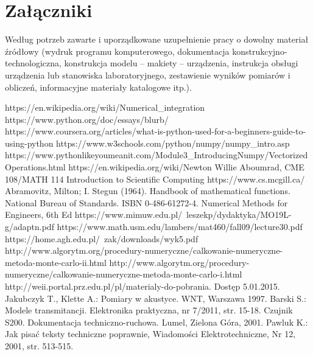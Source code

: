 \documentclass[12pt,twoside]{article}
\begin{document}
\clearpage

\section*{Załączniki}

Według potrzeb zawarte i uporządkowane uzupełnienie pracy o dowolny materiał źródłowy (wydruk programu komputerowego, dokumentacja kons\-truk\-cyj\-no-\-tech\-no\-lo\-gicz\-na, konstrukcja modelu -- makiety -- urządzenia, instrukcja obsługi urządzenia lub stanowiska laboratoryjnego, zestawienie wyników pomiarów i obliczeń, informacyjne materiały katalogowe itp.).


\clearpage


\begin{thebibliography}{4}
 https://en.wikipedia.org/wiki/Numerical\_integration
 https://www.python.org/doc/essays/blurb/
 https://www.coursera.org/articles/what-is-python-used-for-a-beginners-guide-to-using-python
 https://www.w3schools.com/python/numpy/numpy\_intro.asp
 https://www.pythonlikeyoumeanit.com/Module3\_IntroducingNumpy/VectorizedOperations.html
 https://en.wikipedia.org/wiki/Newton%
 Willie Aboumrad, CME 108/MATH 114 Introduction to Scientific Computing
 https://www.cs.mcgill.ca/
 Abramovitz, Milton; I. Stegun (1964). Handbook of mathematical functions. National Bureau of Standards. ISBN 0-486-61272-4.
 Numerical Methods for Engineers, 6th Ed
 https://www.mimuw.edu.pl/~leszekp/dydaktyka/MO19L-g/adaptn.pdf
 https://www.math.usm.edu/lambers/mat460/fall09/lecture30.pdf
 https://home.agh.edu.pl/~zak/downloads/wyk5.pdf
 http://www.algorytm.org/procedury-numeryczne/calkowanie-numeryczne-metoda-monte-carlo-ii.html
 http://www.algorytm.org/procedury-numeryczne/calkowanie-numeryczne-metoda-monte-carlo-i.html
 http://weii.portal.prz.edu.pl/pl/materialy-do-pobrania. Dostęp 5.01.2015.
 Jakubczyk T., Klette A.: Pomiary w akustyce. WNT, Warszawa 1997.
 Barski S.: Modele transmitancji. Elektronika praktyczna, nr 7/2011, str. 15-18.
 Czujnik S200. Dokumentacja techniczno-ruchowa. Lumel, Zielona Góra, 2001.
 Pawluk K.: Jak pisać teksty techniczne poprawnie, Wiadomości Elektrotechniczne, Nr 12, 2001, str. 513-515.
\end{thebibliography}

\clearpage

\makesummary
\end{document}
